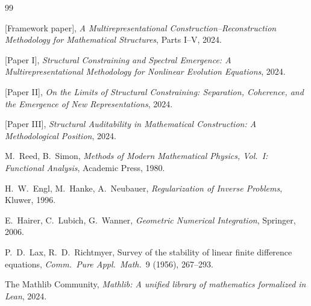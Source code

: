 \documentclass[11pt,a4paper]{article}
\theoremstyle{definition}
\theoremstyle{plain}
\begin{document}
\begin{thebibliography}{99}

[Framework paper],
\emph{A Multirepresentational Construction--Reconstruction
Methodology for Mathematical Structures}, Parts I--V, 2024.

[Paper I],
\emph{Structural Constraining and Spectral Emergence: A
Multirepresentational Methodology for Nonlinear Evolution
Equations}, 2024.

[Paper II],
\emph{On the Limits of Structural Constraining: Separation,
Coherence, and the Emergence of New Representations}, 2024.

[Paper III],
\emph{Structural Auditability in Mathematical Construction: A
Methodological Position}, 2024.

M.~Reed, B.~Simon,
\emph{Methods of Modern Mathematical Physics, Vol.~I: Functional
Analysis}, Academic Press, 1980.

H.~W.~Engl, M.~Hanke, A.~Neubauer,
\emph{Regularization of Inverse Problems}, Kluwer, 1996.

E.~Hairer, C.~Lubich, G.~Wanner,
\emph{Geometric Numerical Integration}, Springer, 2006.

P.~D.~Lax, R.~D.~Richtmyer,
Survey of the stability of linear finite difference equations,
\emph{Comm.~Pure Appl.~Math.}~9 (1956), 267--293.

The Mathlib Community,
\emph{Mathlib: A unified library of mathematics formalized in Lean},
2024.

\end{thebibliography}
\end{document}
